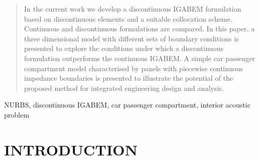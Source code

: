 \documentclass[review]{elsarticle}
\begin{document}
\begin{frontmatter}
\begin{abstract}
In the current work we develop a discontinuous IGABEM formulation based on discontinuous elements and a suitable collocation scheme. Continuous and discontinuous formulations are compared. In this paper, a three dimensional model with different sets of boundary conditions is presented to explore the conditions under which a discontinuous formulation outperforms the continuous IGABEM. A simple car passenger compartment model characterised by panels with piecewise continuous impedance boundaries is presented to illustrate the potential of the proposed method for integrated engineering design and analysis.
\end{abstract}

\begin{keyword}
NURBS, discontinuous IGABEM, car passenger compartment, interior acoustic problem
\end{keyword}

\end{frontmatter}

\linenumbers

\section{INTRODUCTION}


\end{document}
